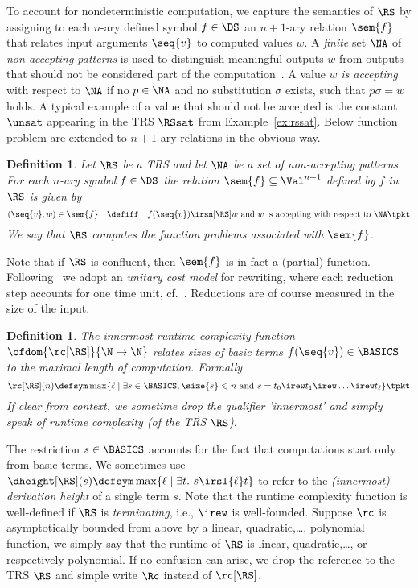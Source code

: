 \documentclass{LMCS}
\newtheorem{definition}[thm]{Definition}
\begin{document}
To account for nondeterministic computation, 
we capture the semantics of $\RS$ by assigning to each $n$-ary defined symbol 
$f \in \DS$ an $n+1$-ary relation $\sem{f}$ that relates
input arguments $\seq{v}$ to computed values $w$.
A \emph{finite} set $\NA$ of \emph{non-accepting patterns} 
is used to distinguish meaningful outputs
$w$ from outputs that should not be considered part of the 
computation~\cite{BonfanteMoser:2010}.
A value $w$ \emph{is accepting} with respect to $\NA$ 
if no $p \in \NA$ and no substitution $\sigma$ exists, such that 
$p\sigma = w$ holds. A typical example of a value that should 
not be accepted is the constant $\unsat$ 
appearing in the TRS $\RSsat$ from Example~\ref{ex:rssat}.
Below function problem are extended to $n+1$-ary relations in the obvious way.
\begin{definition}
\label{d:computation}
Let $\RS$ be a TRS and let 
$\NA$ be a set of non-accepting patterns.
For each $n$-ary symbol $f \in \DS$ the 
\emph{relation $\sem{f} \subseteq {\Val^{n+1}}$ defined by $f$ in $\RS$}
is given by
\begin{equation*}
{(\seq{v},w) \in \sem{f}} \quad\defiff\quad {f(\seq{v}) \irsn[\RS] w} \text{ and $w$ is accepting with respect to $\NA$}\tpkt
\end{equation*}
We say that $\RS$ \emph{computes} the function problems associated with $\sem{f}$.
\end{definition}

Note that if $\RS$ is confluent, then $\sem{f}$ is in fact a (partial) function. 
Following~\cite{HM08,AM10b} we adopt an \emph{unitary cost model} for rewriting, 
where each reduction step accounts for one time unit, cf.~\cite{LM09,LM:2009b}.
Reductions are of course measured in the size of the input. 
\begin{definition}
The \emph{innermost runtime complexity function} $\ofdom{\rc[\RS]}{\N \to \N}$
relates sizes of basic terms $f(\seq{v}) \in \BASICS$ to the maximal 
length of computation. Formally
$$
 \rc[\RS](n) \defsym 
 \max\{\ell \mid \exists s \in \BASICS, \size{s} \leqslant n \text{ and } s  = t_0 \irew t_1 \irew \dots \irew t_\ell\} \tpkt
$$
If clear from context, we sometime drop the qualifier 'innermost' and
simply speak of \emph{runtime complexity} (of the TRS $\RS$).
\end{definition}

The restriction $s \in \BASICS$ accounts for the fact that computations start only from basic terms. 
We sometimes use $\dheight[\RS](s) \defsym \max\{\ell \mid \exists t.~s \irsl{\ell} t\}$
to refer to the \emph{(innermost) derivation height} of a single term $s$.
Note that the runtime complexity function is well-defined if $\RS$ is \emph{terminating}, 
i.e., $\irew$ is well-founded. 
Suppose $\rc$ is asymptotically bounded from above by a linear, quadratic,\dots, 
polynomial function, we simply say that the runtime of $\RS$ is linear, quadratic,\dots, 
or respectively polynomial.
If no confusion can arise, we drop the reference to the TRS $\RS$ and
simple write $\Rc$ instead of $\rc[\RS]$.
\end{document}
